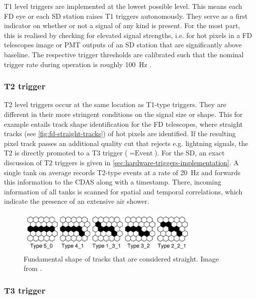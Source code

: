 T1 level triggers are implemented at the lowest possible level. This means each FD eye or each SD station raises T1 triggers autonomously. They serve as a first 
indicator on whether or not a signal of any kind is present. For the most part, this is realised by checking for elevated signal strengths, i.e. for hot pixels 
in a FD telescopes image or PMT outputs of an SD station that are significantly above baseline. The respective trigger thresholds are calibrated such that the 
nominal trigger rate during operation is roughly \SI{100}{\hertz} \cite{FDReconstruction, SDReconstruction}. 

\subsubsection{T2 trigger}
\label{sssec:t2-trigger}

T2 level triggers occur at the same location as T1-type triggers. They are different in their more stringent conditions on the signal size or shape. This for 
example entails track shape identification for the FD telescopes, where straight tracks (see \autoref{fig:fd-straight-tracks}) of hot pixels are identified. 
If the resulting pixel track passes an additional quality cut that rejects e.g. lightning signals, the T2 is directly promoted to a T3 trigger ($=\text{Event}$). 
For the SD, an exact discussion of T2 triggers is given in \autoref{sec:hardware-triggers-implementation}. A single tank on average records T2-type events at a 
rate of \SI{20}{\hertz} and forwards this information to the CDAS along with a timestamp. There, incoming information of all tanks is scanned for spatial and 
temporal correlations, which indicate the presence of an extensive air shower. 

\begin{figure}
	\centering
	\includegraphics[width=0.8\textwidth]{./imgs/FD_straight_tracks.png}
	\caption{Fundamental shape of tracks that are considered straight. Image from \cite{FDReconstruction}.}
	\label{fig:fd-straight-tracks}
\end{figure}

\subsubsection{T3 trigger}
\label{sssec:t3-trigger}

